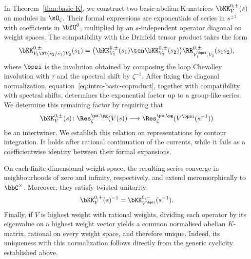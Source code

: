 \documentclass[reqno]{amsart}
\numberwithin{equation}{section}
\begin{document}
In Theorem~\ref{thm:basic-K}, we construct two basic abelian K-matrices 
$\bKK^{0,\pm}_V(s)$ on modules in $\sO_\zeta$.
Their formal expressions are exponentials of series in $s^{\pm1}$ with coefficients in 
$\bfU^0$, multiplied by an $s$-independent operator diagonal on weight spaces.
The compatibility with the Drinfeld tensor product takes the form
\begin{equation}\label{eq:intro-basic-coproduct}
	\bKK^{0,\pm}_{V_1\DT{s_2/s_1}V_2}(s_1)
	=\bigl(\bKK^{0,\pm}_{V_1}(s_1)\ten\bKK^{0,\pm}_{V_2}(s_2)\bigr)
	\RR^{0,\pm}_{V_1^\bpsi,V_2}(s_1s_2),
\end{equation}
where $\bpsi$ is the involution obtained by composing the loop Chevalley involution 
with $\tau$ and the spectral shift by $\zeta^{-1}$.
After fixing the diagonal normalization, equation~\eqref{eq:intro-basic-coproduct}, 
together with compatibility with spectral shifts, determines the exponential factor up 
to a group-like series.
We determine this remaining factor by requiring that
\begin{equation}\label{eq:intro-basic-intertwiner}
	\bKK^{0,\pm}_V(s)\colon
	\Res_{\zeta}^{\ps,\pg}(V(s))
	\longrightarrow
	\Res_{\zeta}^{\ps,\pg}(V^\bpsi(s^{-1}))
\end{equation}
be an intertwiner.
We establish this relation on representations by contour integration.
It holds after rational continuation of the currents, while it fails as a coefficientwise 
identity between their formal expansions.

On each finite-dimensional weight space, the resulting series converge in 
neighbourhoods of zero and infinity, respectively, and extend meromorphically to 
$\bbC^\times$.
Moreover, they satisfy twisted unitarity:
\[
\bKK^{0,+}_V(s)^{-1}=\bKK^{0,-}_{V^{\bpsi}}(s^{-1}).
\]
Finally, if $V$ is highest weight with rational weights, dividing each operator by its 
eigenvalue on a highest weight vector yields a common normalised abelian 
$K$-matrix, rational on every weight space, and therefore unique.
Indeed, its uniqueness with this normalization follows directly from the generic cyclicity 
established above.

\end{document}
